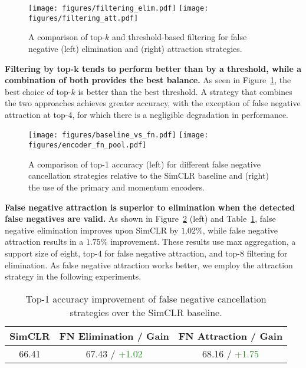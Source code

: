 \documentclass[10pt,twocolumn,letterpaper]{article}
\begin{document}
\begin{figure}[!th]
\texttt{[image: figures/filtering\_elim.pdf]}\hfil
    \texttt{[image: figures/filtering\_att.pdf]}
    \caption{A comparison of top-$k$ and threshold-based filtering for false negative (left) elimination and (right) attraction strategies.} \label{fig:filtering}
\end{figure}
\textbf{Filtering by top-$\bm{k}$ tends to perform better than by a threshold, while a combination of both provides the best balance.} As seen in Figure~\ref{fig:filtering}, the best choice of top-$k$ is better than the best threshold. A strategy that combines the two approaches achieves greater accuracy, with the exception of false negative attraction at top-4, for which there is a negligible degradation in performance. 

\begin{figure}[!th]
    \texttt{[image: figures/baseline\_vs\_fn.pdf]}\hfil
    \texttt{[image: figures/encoder\_fn\_pool.pdf]}
    \caption{A comparison of top-1 accuracy (left) for different false negative cancellation strategies relative to the SimCLR baseline and (right) the use of the primary and momentum encoders.} \label{fig:baseline_vs_fn_encoder_fn_pool}
\end{figure}
\textbf{False negative attraction is superior to elimination when the detected false negatives are valid.} As shown in Figure~\ref{fig:baseline_vs_fn_encoder_fn_pool} (left) and Table~\ref{tab:fn_elim_att}, false negative elimination improves upon SimCLR by $1.02\%$, while false negative attraction results in a $1.75\%$ improvement. These results use max aggregation, a support size of eight, top-4 for false negative attraction, and top-8 filtering for elimination. As false negative attraction works better, we employ the attraction strategy in the following experiments.
\begin{table}
    \footnotesize
    \centering
    \begin{tabularx}{1.0\linewidth}{ccc}
    \toprule
    SimCLR & FN Elimination / Gain & FN Attraction / Gain\\
    \midrule
    66.41 & 67.43 / \textcolor{ForestGreen}{+1.02} & 68.16 / \textcolor{ForestGreen}{+1.75} \\
    \bottomrule
    \end{tabularx}
    \vspace{5pt}
    \caption{Top-1 accuracy improvement of false negative cancellation strategies over the SimCLR baseline.}
    \label{tab:fn_elim_att}
\end{table}
\end{document}
